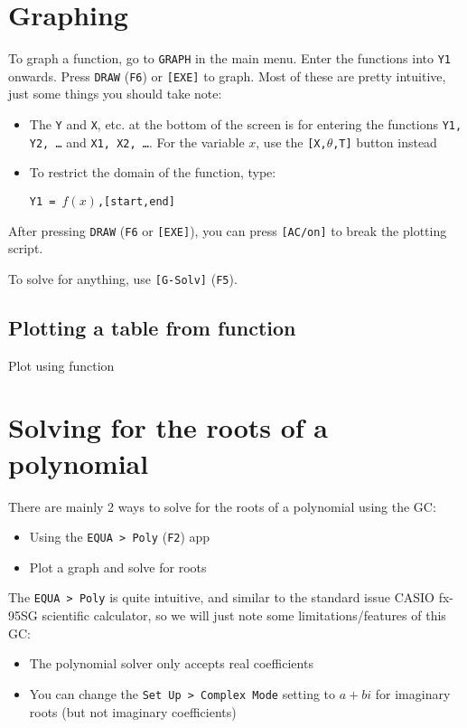 \documentclass[a5paper,draft]{memoir}
\def\code#1{\texttt{#1}}
\begin{document}
\section{Graphing} \label{graphing}
To graph a function, go to \code{GRAPH} in the main menu. Enter the functions into \code{Y1} onwards. Press \code{DRAW} (\code{F6}) or \code{[EXE]} to graph. Most of these are pretty intuitive, just some things you should take note:
\begin{itemize}
	\item The \code{Y} and \code{X}, etc. at the bottom of the screen is for entering the functions \code{Y1, Y2, \dots} and \code{X1, X2, \dots}. For the variable $x$, use the \code{[X,$\theta$,T]} button instead
	\item To restrict the domain of the function, type:
	\begin{center}
		\code{Y1 = $f(x)$,[start,end]}
	\end{center}
\end{itemize}

After pressing \code{DRAW} (\code{F6} or \code{[EXE]}), you can press \code{[AC/on]} to break the plotting script.

To solve for anything, use \code{[G-Solv]} (\code{F5}).

\subsection{Plotting a table from function} \label{plottable}
Plot using function


\section{Solving for the roots of a polynomial}
There are mainly 2 ways to solve for the roots of a polynomial using the GC:
\begin{itemize}
	\item Using the \code{EQUA > Poly} (\code{F2}) app
	\item Plot a graph and solve for roots
\end{itemize}

The \code{EQUA > Poly} is quite intuitive, and similar to the standard issue CASIO fx-95SG scientific calculator, so we will just note some limitations/features of this GC:
\begin{itemize}
	\item The polynomial solver only accepts real coefficients
	\item You can change the \code{Set Up > Complex Mode} setting to \code{$a+bi$} for imaginary roots (but not imaginary coefficients)
\end{itemize}
\end{document}
